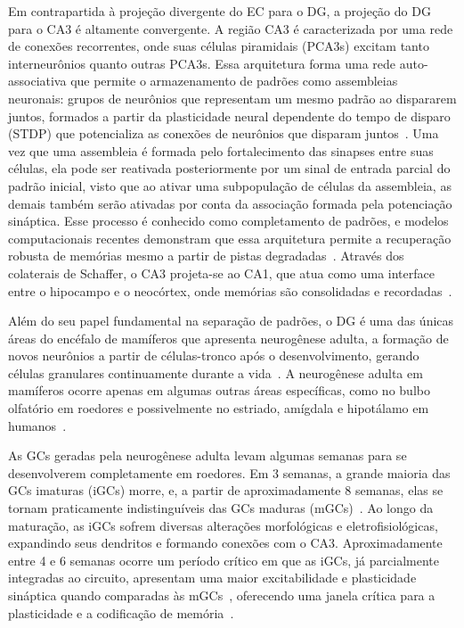 Em contrapartida à projeção divergente do EC para o DG, a projeção do DG para o CA3 é altamente convergente. A região CA3 é
caracterizada por uma rede de conexões recorrentes, onde suas células piramidais (PCA3s) excitam tanto interneurônios quanto
outras PCA3s. Essa arquitetura forma uma rede auto-associativa que permite o armazenamento de padrões como assembleias neuronais:
grupos de neurônios que representam um mesmo padrão ao dispararem juntos, formados a partir da plasticidade neural dependente do
tempo de disparo (STDP) que potencializa as conexões de neurônios que disparam juntos~\cite{kopsickFormation2024}. Uma vez que uma
assembleia é formada pelo fortalecimento das sinapses entre suas células, ela pode ser reativada posteriormente por um sinal de
entrada parcial do padrão inicial, visto que ao ativar uma subpopulação de células da assembleia, as demais também serão ativadas
por conta da associação formada pela potenciação sináptica. Esse processo é conhecido como completamento de padrões, e modelos
computacionais recentes demonstram que essa arquitetura permite a recuperação robusta de memórias mesmo a partir de pistas
degradadas~\cite{kopsickFormation2024, leduigouRecurrent2014}. Através dos colaterais de Schaffer, o CA3 projeta-se ao CA1, que
atua como uma interface entre o hipocampo e o neocórtex, onde memórias são consolidadas e recordadas~\cite{bartschCA12011}.

Além do seu papel fundamental na separação de padrões, o DG é uma das únicas áreas do encéfalo de mamíferos que apresenta
neurogênese adulta, a formação de novos neurônios a partir de células-tronco após o desenvolvimento, gerando células granulares
continuamente durante a vida~\cite{boldriniHuman2018, dumitruIdentification2025}. A neurogênese adulta em mamíferos ocorre apenas
em algumas outras áreas específicas, como no bulbo olfatório em roedores e possivelmente no estriado, amígdala e hipotálamo em
humanos~\cite{alonsoImpact2024, jurkowskiHippocampus2020}.

As GCs geradas pela neurogênese adulta levam algumas semanas para se desenvolverem completamente em roedores. Em 3 semanas, a
grande maioria das GCs imaturas (iGCs) morre, e, a partir de aproximadamente 8 semanas, elas se tornam praticamente
indistinguíveis das GCs maduras (mGCs)~\cite{denoth-lippunerFormation2021}. Ao longo da maturação, as iGCs sofrem diversas
alterações morfológicas e eletrofisiológicas, expandindo seus dendritos e formando conexões com o CA3. Aproximadamente entre 4 e 6
semanas ocorre um período crítico em que as iGCs, já parcialmente integradas ao circuito, apresentam uma maior excitabilidade e
plasticidade sináptica quando comparadas às mGCs~\cite{zhaoDistinct2006,denoth-lippunerFormation2021, aimoneRegulation2014},
oferecendo uma janela crítica para a plasticidade e a codificação de memória~\cite{berdugo-vegaSharpening2023}.

